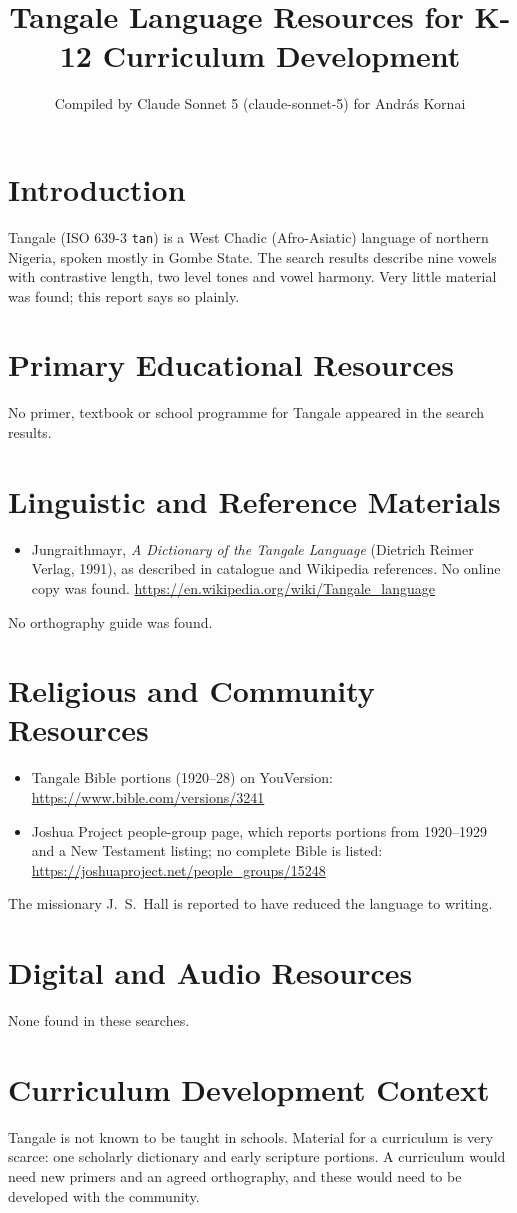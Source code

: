 \documentclass[12pt]{article}
\title{Tangale Language Resources for K-12 Curriculum Development}
\author{Compiled by Claude Sonnet 5 (claude-sonnet-5) for Andr\'as Kornai}
\date{}
\begin{document}
\maketitle
\section{Introduction}
Tangale (ISO 639-3 \texttt{tan}) is a West Chadic (Afro-Asiatic) language of northern Nigeria, spoken mostly in Gombe State. The search results describe nine vowels with contrastive length, two level tones and vowel harmony. Very little material was found; this report says so plainly.
\section{Primary Educational Resources}
No primer, textbook or school programme for Tangale appeared in the search results.
\section{Linguistic and Reference Materials}
\begin{itemize}
\item Jungraithmayr, \emph{A Dictionary of the Tangale Language} (Dietrich Reimer Verlag, 1991), as described in catalogue and Wikipedia references. No online copy was found. \url{https://en.wikipedia.org/wiki/Tangale_language}
\end{itemize}
No orthography guide was found.
\section{Religious and Community Resources}
\begin{itemize}
\item Tangale Bible portions (1920--28) on YouVersion: \url{https://www.bible.com/versions/3241}
\item Joshua Project people-group page, which reports portions from 1920--1929 and a New Testament listing; no complete Bible is listed: \url{https://joshuaproject.net/people_groups/15248}
\end{itemize}
The missionary J.~S.~Hall is reported to have reduced the language to writing.
\section{Digital and Audio Resources}
None found in these searches.
\section{Curriculum Development Context}
Tangale is not known to be taught in schools. Material for a curriculum is very scarce: one scholarly dictionary and early scripture portions. A curriculum would need new primers and an agreed orthography, and these would need to be developed with the community.
\end{document}
